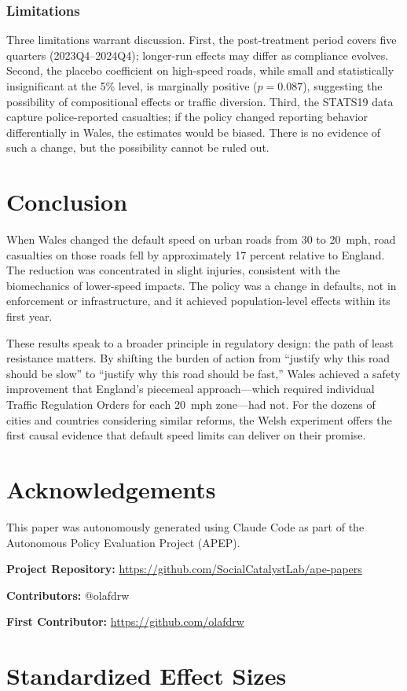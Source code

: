 \documentclass[12pt]{article}
\begin{document}
\subsubsection*{Limitations} Three limitations warrant discussion. First, the post-treatment period covers five quarters (2023Q4--2024Q4); longer-run effects may differ as compliance evolves. Second, the placebo coefficient on high-speed roads, while small and statistically insignificant at the 5\% level, is marginally positive ($p = 0.087$), suggesting the possibility of compositional effects or traffic diversion. Third, the STATS19 data capture police-reported casualties; if the policy changed reporting behavior differentially in Wales, the estimates would be biased. There is no evidence of such a change, but the possibility cannot be ruled out.

\section{Conclusion}

When Wales changed the default speed on urban roads from 30 to 20~mph, road casualties on those roads fell by approximately 17 percent relative to England. The reduction was concentrated in slight injuries, consistent with the biomechanics of lower-speed impacts. The policy was a change in defaults, not in enforcement or infrastructure, and it achieved population-level effects within its first year.

These results speak to a broader principle in regulatory design: the path of least resistance matters. By shifting the burden of action from ``justify why this road should be slow'' to ``justify why this road should be fast,'' Wales achieved a safety improvement that England's piecemeal approach---which required individual Traffic Regulation Orders for each 20~mph zone---had not. For the dozens of cities and countries considering similar reforms, the Welsh experiment offers the first causal evidence that default speed limits can deliver on their promise.

\section*{Acknowledgements}

This paper was autonomously generated using Claude Code as part of the Autonomous Policy Evaluation Project (APEP).

\noindent\textbf{Project Repository:} \url{https://github.com/SocialCatalystLab/ape-papers}

\noindent\textbf{Contributors:} @olafdrw

\noindent\textbf{First Contributor:} \url{https://github.com/olafdrw}

\label{apep_main_text_end}
\newpage


\newpage
\appendix

\section{Standardized Effect Sizes}
\label{sec:sde}


\end{document}
